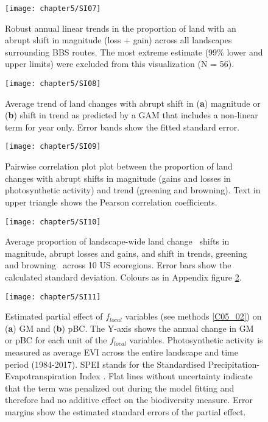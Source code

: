 \begin{figure}[htb]
\centering
\texttt{[image: chapter5/SI07]}
\caption{Robust annual linear trends in the proportion of land with an abrupt shift in magnitude (loss + gain) across all landscapes surrounding BBS routes. The most extreme estimate (99\% lower and upper limits) were excluded from this visualization (N = 56). }
\label{SI05_07}
\end{figure}

\begin{figure}[htb]
\centering
\texttt{[image: chapter5/SI08]}
\caption{Average trend of land changes with abrupt shift in (\textbf{a}) magnitude or (\textbf{b}) shift in trend as predicted by a GAM that includes a non-linear term for year only. Error bands show the fitted standard error.}
\label{SI05_08}
\end{figure}

\begin{figure}[htb]
\centering
\texttt{[image: chapter5/SI09]}
\caption{Pairwise correlation plot plot between the proportion of land changes with abrupt shifts in magnitude (gains and losses in photosynthetic activity) and trend (greening and browning). Text in upper triangle shows the Pearson correlation coefficients.}
\label{SI05_09}
\end{figure}

\begin{figure}[htb]
\centering
\texttt{[image: chapter5/SI10]}
\caption{Average proportion of landscape-wide land change \textendash\ shifts in magnitude, \eg abrupt losses and gains, and shift in trends, \eg greening and browning \textendash\ across 10 US ecoregions. Error bars show the calculated standard deviation. Colours as in Appendix figure \ref{SI05_08}.}
\label{SI05_10}
\end{figure}

\begin{figure}[htb]
\centering
\texttt{[image: chapter5/SI11]}
\caption{Estimated partial effect of $f_{local}$ variables (see methods \ref{C05_02}) on (\textbf{a}) GM and (\textbf{b}) pBC. The Y-axis shows the annual change in GM or pBC for each unit of the $f_{local}$ variables. Photosynthetic activity is measured as average EVI across the entire landscape and time period (1984-2017). SPEI stands for the Standardised Precipitation-Evapotranspiration Index \citep{Vicente-Serrano2010}. Flat lines without uncertainty indicate that the term was penalized out during the model fitting and therefore had no additive effect on the biodiversity measure. Error margins show the estimated standard errors of the partial effect.
}
\label{SI05_11}
\end{figure}

